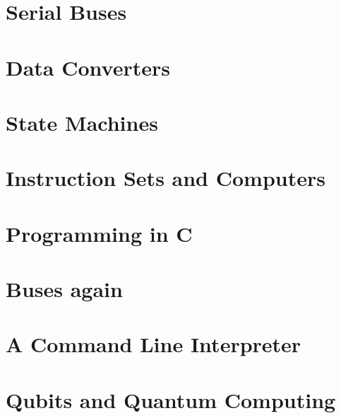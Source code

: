 \documentclass{book}
\begin{document}
\addtocounter{page}{2}



\setcounter{tocdepth}{3}
\tableofcontents

\mainmatter







\chapter{Serial Buses }
\chapter{Data Converters}
\chapter{State Machines}
\chapter{Instruction Sets and Computers}
\chapter{Programming in C}
\chapter{Buses again}
\chapter{A Command Line Interpreter}
\chapter{Qubits and Quantum Computing}

\appendix
\appendixpage
\noappendicestocpagenum
\addappheadtotoc















\backmatter
{}
\printindex
\end{document}
